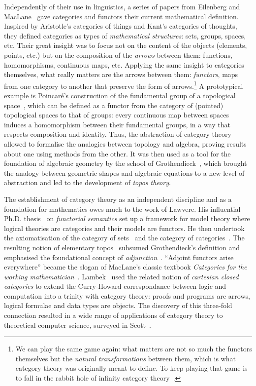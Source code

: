 Independently of their use in linguistics, a series of papers from Eilenberg and MacLane~\cite{EilenbergMacLane42,EilenbergMacLane42a,EilenbergMacLane45} gave categories and functors their current mathematical definition.
Inspired by Aristotle's categories of things and Kant's categories of thoughts, they defined categories as types of \emph{mathematical structures}: sets, groups, spaces, etc.
Their great insight was to focus not on the content of the objects (elements, points, etc.) but on the composition of the \emph{arrows} between them: functions, homomorphisms, continuous maps, etc.
Applying the same insight to categories themselves, what really matters are the arrows between them: \emph{functors}, maps from one category to another that preserve the form of arrows.\footnote
{We can play the same game again: what matters are not so much the functors themselves but the \emph{natural transformations} between them, which is what category theory was originally meant to define.
To keep playing that game is to fall in the rabbit hole of infinity category theory~\cite{RiehlVerity16}.}
A prototypical example is Poincaré's construction of the fundamental group of a topological space~\cite{Poincare95}, which can be defined as a functor from the category of (pointed) topological spaces to that of groups: every continuous map between spaces induces a homomorphism between their fundamental groups, in a way that respects composition and identity.
Thus, the abstraction of category theory allowed to formalise the analogies between topology and algebra, proving results about one using methods from the other.
It was then used as a tool for the foundation of algebraic geometry by the school of Grothendieck~\cite{GrothendieckDieudonne60}, which brought the analogy between geometric shapes and algebraic equations to a new level of abstraction and led to the development of \emph{topos theory}.

The establishment of category theory as an independent discipline and as a foundation for mathematics owes much to the work of Lawvere.
His influential Ph.D. thesis~\cite{Lawvere63} on \emph{functorial semantics} set up a framework for model theory where logical theories are categories and their models are functors.
He then undertook the axiomatisation of the category of sets~\cite{Lawvere64} and the category of categories~\cite{Lawvere66}.
The resulting notion of elementary topos~\cite{Lawvere70a} subsumed Grothendieck's definition and emphasised the foundational concept of \emph{adjunction}~\cite{Lawvere69a,Lawvere70}.
``Adjoint functors arise everywhere'' became the slogan of MacLane's classic textbook \emph{Categories for the working mathematician}~\cite{MacLane71}.
Lambek~\cite{Lambek68,Lambek69,Lambek72} used the related notion of \emph{cartesian closed categories} to extend the Curry-Howard correspondance between logic and computation into a trinity with category theory: proofs and programs are arrows, logical formulae and data types are objects.
The discovery of this three-fold connection resulted in a wide range of applications of category theory to theoretical computer science, surveyed in Scott~\cite{Scott00}.

